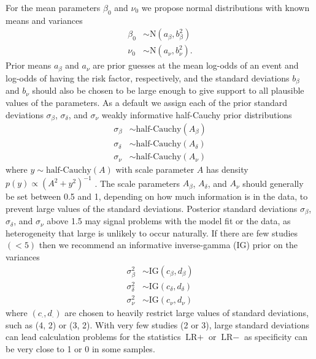 \documentclass[AMA,STIX1COL]{WileyNJD-v2}
\begin{document}
For the mean parameters $\beta_0$ and $\nu_0$ we propose normal distributions with known means and variances
\begin{align}
\beta_0 &\sim \mbox{N}(a_\beta, b_\beta^2) \label{eq:beta0} \\
\nu_0 &\sim \mbox{N}(a_\nu, b_\nu^2). \label{eq:nu0}
\end{align}
\noindent Prior means $a_\beta$ and $a_\nu$ are prior guesses at the mean log-odds of an event and log-odds of having the risk factor, respectively, and the standard deviations $b_\beta$ and $b_\nu$ should also be chosen to be large enough to give support to all plausible values of the parameters. As a default we assign each of the prior standard deviations $\sigma_\beta$, $\sigma_\delta$, and $\sigma_\nu$ weakly informative half-Cauchy prior distributions
\begin{align}
\sigma_\beta &\sim \mbox{half-Cauchy}(A_\beta) \label{eq:sigmabeta} \\
\sigma_\delta &\sim \mbox{half-Cauchy}(A_\delta) \label{eq:sigmadelta} \\
\sigma_\nu &\sim \mbox{half-Cauchy}(A_\nu) \label{eq:sigmanu}
\end{align}
where $y \sim \mbox{half-Cauchy}(A)$ with scale parameter $A$ has density $p(y) \propto (A^2 + y^2)^{-1}$ \cite{gelman2006prior}. The scale parameters $A_\beta$, $A_\delta$, and $A_\nu$ should generally be set between 0.5 and 1, depending on how much information is in the data, to prevent large values of the standard deviations. Posterior standard deviations $\sigma_\beta$, $\sigma_\delta$, and $\sigma_\nu$ above 1.5 may signal problems with the model fit or the data, as heterogeneity that large is unlikely to occur naturally. If there are few studies $(< 5)$ then we recommend an informative inverse-gamma (IG) prior on the variances
\begin{align}
\sigma_\beta^2 &\sim \mbox{IG}(c_\beta, d_\beta)  \nonumber \\
\sigma_\delta^2 &\sim \mbox{IG}(c_\delta, d_\delta)  \nonumber \\
\sigma_\nu^2 &\sim \mbox{IG}(c_\nu, d_\nu) \nonumber
\end{align}
\noindent where $(c_\cdot, d_\cdot)$ are chosen to heavily restrict large values of standard deviations, such as (4, 2) or (3, 2). With very few studies (2 or 3), large standard deviations can lead calculation problems for the statistics $\mbox{LR}+$ or $\mbox{LR}-$ as specificity can be very close to 1 or 0 in some samples.
\end{document}
